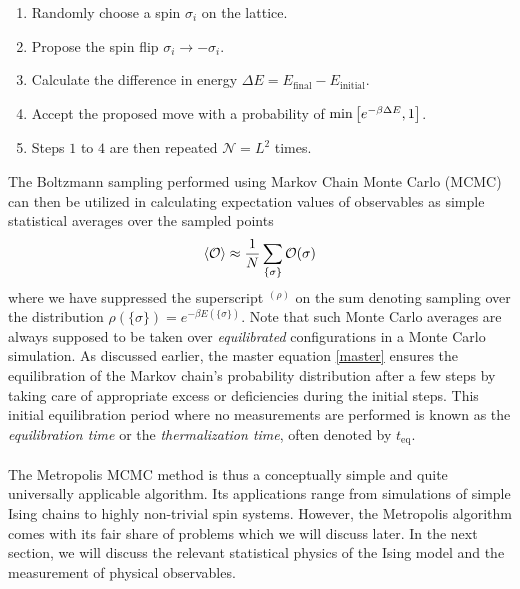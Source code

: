 \documentclass[../journal_main.tex]{subfiles}
\begin{document}
\begin{enumerate}
    \setlength\itemsep{0.3em}
    \item Randomly choose a spin $\sigma_i$ on the lattice.
    \item Propose the spin flip $\sigma_i \to - \sigma_i$.
    \item Calculate the difference in energy $\Delta E = E_\text{final} - E_\text{initial}$.
    \item Accept the proposed move with a probability of $\min \qty[e^{-\beta \Delta E}, 1]$.
    \item Steps $1$ to $4$ are then repeated $\mathcal{N} = L^2$ times.       
\end{enumerate}
The Boltzmann sampling performed using Markov Chain Monte Carlo (MCMC) can then be utilized in calculating expectation values of observables as simple statistical averages over the sampled points
\begin{equation}
    \expval{\mathcal{O}} \approx \frac{1}{N} \sum_{\{\sigma\}} \mathcal{O(\sigma)}
\end{equation}
where we have suppressed the superscript ${}^{(\rho)}$ on the sum denoting sampling over the distribution $\rho(\{\sigma\}) = e^{-\beta E(\{\sigma\})}$. Note that such Monte Carlo averages are always supposed to be taken over \textit{equilibrated} configurations in a Monte Carlo simulation. As discussed earlier, the master equation \eqref{master} ensures the equilibration of the Markov chain's probability distribution after a few steps by taking care of appropriate excess or deficiencies during the initial steps. This initial equilibration period where no measurements are performed is known as the \textit{equilibration time} or the \textit{thermalization time}, often denoted by $t_\text{eq}$.~\\~\\
The Metropolis MCMC method is thus a conceptually simple and quite universally applicable algorithm. Its applications range from simulations of simple Ising chains to highly non-trivial spin systems. However, the Metropolis algorithm comes with its fair share of problems which we will discuss later. In the next section, we will discuss the relevant statistical physics of the Ising model and the measurement of physical observables.
\end{document}
